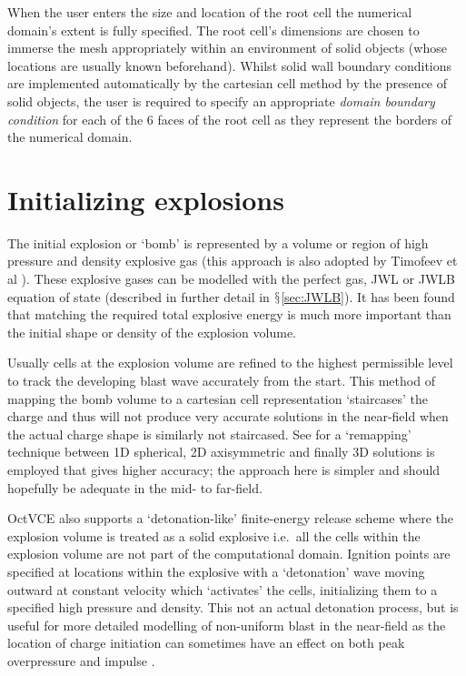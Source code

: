 \documentclass[pdftex, 12pt, a4paper]{report}
\begin{document}
When the user enters the size and location of the root cell the numerical domain's extent is fully specified.  The 
root cell's dimensions are chosen to immerse the mesh appropriately within an environment of solid objects (whose locations
are usually known beforehand).  Whilst solid wall boundary conditions are implemented automatically by the cartesian cell method
by the presence of solid objects, the user is required to specify an appropriate \emph{domain boundary condition} for each
of the 6 faces of the root cell as they represent the borders of the numerical domain.             

\section{Initializing explosions}\label{sec:explo}

The initial explosion or `bomb' is represented by a volume or region of high pressure and density explosive gas (this approach is
also adopted by Timofeev et al \cite{Timofeev:au}).  These explosive gases can be modelled with the perfect gas, JWL \cite{Lee:ae}
or JWLB \cite{Baker:io} equation of state (described in further detail in $\mathsection$\ref{sec:JWLB}).  It has been found that 
matching the required total explosive energy is much more
important than the initial shape or density of the explosion volume.  

Usually cells at the explosion volume are refined to
the highest permissible level to track the developing blast wave accurately from the start.  This method of mapping the
bomb volume to a cartesian cell representation `staircases' the charge and thus will not produce very accurate solutions in the 
near-field when the actual charge shape is similarly not staircased.  See \cite{Rose:thesis} for a `remapping' technique between 1D spherical, 
2D axisymmetric and finally 3D solutions is employed that gives higher accuracy; the approach here is simpler
and should hopefully be adequate in the mid- to far-field.

OctVCE also supports a `detonation-like' finite-energy release scheme where the explosion volume is treated as a solid 
explosive i.e.\ all the cells within the explosion volume are not part of the computational domain. 
Ignition points are specified at locations within the explosive with
a `detonation' wave moving outward at constant velocity which `activates' the cells, initializing them to a specified high
pressure and density.  This not an actual detonation process, but is useful for more detailed modelling of non-uniform
blast in the near-field as the location of charge initiation can sometimes have an effect on both peak overpressure 
and impulse \cite{Anderson:ao}. 
\end{document}

